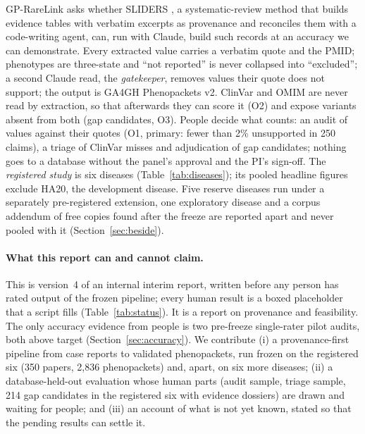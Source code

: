 \documentclass{article} %
\begin{document}
GP-RareLink asks whether SLIDERS \citep{joshi2026_sliders}, a systematic-review method that builds evidence tables with verbatim excerpts as provenance and reconciles them with a code-writing agent, can, run with Claude, build such records at an accuracy we can demonstrate. Every extracted value carries a verbatim quote and the PMID; phenotypes are three-state and ``not reported'' is never collapsed into ``excluded''; a second Claude read, the \emph{gatekeeper}, removes values their quote does not support; the output is GA4GH Phenopackets v2. ClinVar and OMIM are never read by extraction, so that afterwards they can score it (O2) and expose variants absent from both (gap candidates, O3). People decide what counts: an audit of values against their quotes (O1, primary: fewer than 2\% unsupported in 250 claims), a triage of ClinVar misses and adjudication of gap candidates; nothing goes to a database without the panel's approval and the PI's sign-off. The \emph{registered study} is six diseases (Table~\ref{tab:diseases}); its pooled headline figures exclude HA20, the development disease. Five reserve diseases run under a separately pre-registered extension, one exploratory disease and a corpus addendum of free copies found after the freeze are reported apart and never pooled with it (Section~\ref{sec:beside}).

\paragraph{What this report can and cannot claim.} This is version~4 of an internal interim report, written before any person has rated output of the frozen pipeline; every human result is a boxed placeholder that a script fills (Table~\ref{tab:status}). It is a report on provenance and feasibility. The only accuracy evidence from people is two pre-freeze single-rater pilot audits, both above target (Section~\ref{sec:accuracy}). We contribute (i) a provenance-first pipeline from case reports to validated phenopackets, run frozen on the registered six (350 papers, 2,836 phenopackets) and, apart, on six more diseases; (ii) a database-held-out evaluation whose human parts (audit sample, triage sample, 214 gap candidates in the registered six with evidence dossiers) are drawn and waiting for people; and (iii) an account of what is not yet known, stated so that the pending results can settle it.
\end{document}
